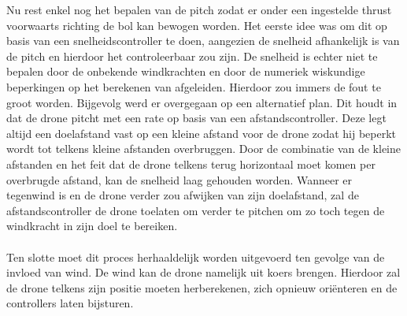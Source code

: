 Nu rest enkel nog het bepalen van de pitch zodat er onder een ingestelde thrust voorwaarts richting de bol kan bewogen worden. Het eerste idee was om dit op basis van een snelheidscontroller te doen, aangezien de snelheid afhankelijk is van de pitch en hierdoor het controleerbaar zou zijn. De snelheid is echter niet te bepalen door de onbekende windkrachten en door de numeriek wiskundige beperkingen op het berekenen van afgeleiden. Hierdoor zou immers de fout te groot worden. Bijgevolg werd er overgegaan op een alternatief plan. Dit houdt in dat de drone pitcht met een rate op basis van een afstandscontroller. Deze legt altijd een doelafstand vast op een kleine afstand voor de drone zodat hij beperkt wordt tot telkens kleine afstanden overbruggen. Door de combinatie van de kleine afstanden en het feit dat de drone telkens terug horizontaal moet komen per overbrugde afstand, kan de snelheid laag gehouden worden. Wanneer er tegenwind is en de drone verder zou afwijken van zijn doelafstand, zal de afstandscontroller de drone toelaten om verder te pitchen om zo toch tegen de windkracht in zijn doel te bereiken.
\\
\\
Ten slotte moet dit proces herhaaldelijk worden uitgevoerd ten gevolge van de invloed van wind. De wind kan de drone namelijk uit koers brengen. Hierdoor zal de drone telkens zijn positie moeten herberekenen, zich opnieuw ori\"enteren en de controllers laten bijsturen.